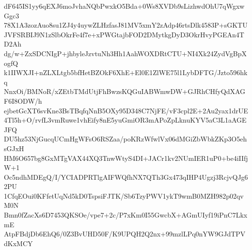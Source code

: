 dF645IS1yy6qEXJ6moJvhaNQbPwxkO5Bda+0Ws8XVDb9sLizhwdOhU7qWgxwGgc3
78X1A3zozAuo8su1ZJ4y4uywZLHzfasJ81MV5xmY2zAdp46rtsDlk4583P+sGKTU
JVFSRBIJ9N1zSlbOkrFe4f7e+xPWGtajbFOD2DMytkgDyD3OkrHvyPGEAn4TD2Ah
dg/w+ZxSDCNIgP+jhbyleJzvtuNh3Hh1AahWOXDRtCTU+NI4Xk24ZydVgBpXogfQ
k1IIWXJI+nZLXLtgb5bfHetBZOkF6XhE+El0E1ZlWE75l1LybDFTG/Jzto596hkq
NnxOi/BMNoR/xZEtbTMdUtjFhBwzsKQGuIABWmwDW+GJRhCHfyQdXAGF6I8ODW/h
ejbetGcXT6svKne3BsTBqfqNnB5OXy95D348C7NjFE/vF3cpl2E+2Au2yax1drUE
4Tl5h+O/rvfL3vmRuwe1vhEify8nE5yuGmiOR3mAPoZpLknuKYV5aC3L1aAGEJFQ
DU5hz53NjGucqUCmHgWFsO6RSZaa/poKRzWfwlVx06dMGiZbWbkZKp3O5ehsGJxH
HM6O657bg8GxMTgVAX44XQ3TnwWtyS4DI+JACr1kv2NUmIER1uP0+be4iIIfjW+1
Oc5ndhMDEgQ/I/YCIADPRTlgAIFWQfhNX7QTh3Gx473qIHP4Ugzj3RcjvQJg62PU
1CfqEOui0KFfetUqNd5kD0TspsiFJTK/Sb6TzyPWV1ykT9wmB0MZH982p02qvM0N
Bmn0fZacXs6D7453QKSOe/vpe7+2c/P7xKm0I55GwcbX+AGmUIyf19iPnC7LkxmE
AtpFBdjDb6EhQ6/0Z3BvUHD50F/K9UPQH2Q2nx+99mzlLPq0nYW9GJdTPVdKxMCY
